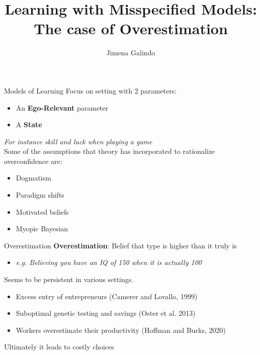 \documentclass[aspectratio=169]{beamer}
\title{Learning with Misspecified Models:\\  
The case of Overestimation}
\author{Jimena Galindo}
\begin{document}
\frame{\titlepage}


\begin{frame}{Models of Learning}
    Focus on setting with 2 parameters:
    \begin{itemize}
        \item An \alert{\textbf{Ego-Relevant}} parameter
        \item A \alert{\textbf{State}}
    \end{itemize}
    \textit{For instance skill and luck when playing a game}\\
    \bigskip
    \pause
    Some of the assumptions that theory has incorporated to rationalize overconfidence are:
    \begin{itemize}
        \item Dogmatism
        \item Paradigm shifts
        \item Motivated beliefs
        \item Myopic Bayesian
    \end{itemize}
\end{frame}

\begin{frame}{Overestimation}
    \textbf{Overestimation}: Belief that type is higher than it truly is\\
    \begin{itemize}
        \item \textit{e.g. Believing you have an IQ of 150 when it is actually 100}
    \end{itemize}
    \bigskip
    \pause
    Seems to be persistent in various settings. 
    \begin{itemize} 
        \item Excess entry of entrepreneurs (Camerer and Lovallo, 1999)
        \item Suboptimal genetic testing and savings (Oster et al. 2013)
        \item  Workers overestimate their productivity (Hoffman and Burks, 2020)
    \end{itemize}
    \bigskip
    \alert{Ultimately it leads to costly choices}
    
\end{frame}
\end{document}
